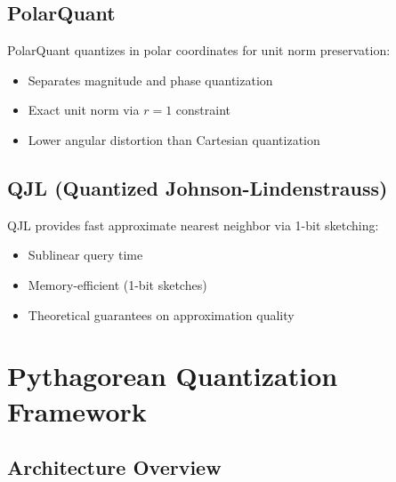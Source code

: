 \documentclass{article}
\begin{document}
\subsection{PolarQuant}

PolarQuant quantizes in polar coordinates for unit norm preservation:

\begin{itemize}
    \item Separates magnitude and phase quantization
    \item Exact unit norm via $r = 1$ constraint
    \item Lower angular distortion than Cartesian quantization
\end{itemize}

\subsection{QJL (Quantized Johnson-Lindenstrauss)}

QJL provides fast approximate nearest neighbor via 1-bit sketching:

\begin{itemize}
    \item Sublinear query time
    \item Memory-efficient (1-bit sketches)
    \item Theoretical guarantees on approximation quality
\end{itemize}

\section{Pythagorean Quantization Framework}

\subsection{Architecture Overview}
\end{document}
